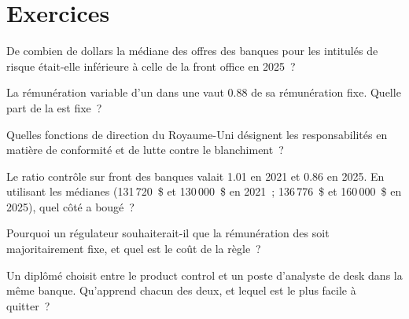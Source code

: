 \section{Exercices}

\begin{exercise}[$\star$]\label{exo:in:risk-operations-product-control-and-compliance:1}
De combien de dollars la médiane des offres des banques pour les intitulés de risque était-elle inférieure à celle de la front office en 2025~?
\end{exercise}

\begin{exercise}[$\star$]\label{exo:in:risk-operations-product-control-and-compliance:2}
La rémunération variable d'un  dans une  vaut 0.88 de sa rémunération fixe. Quelle part de la  est fixe~?
\end{exercise}

\begin{exercise}[$\star$]\label{exo:in:risk-operations-product-control-and-compliance:3}
Quelles fonctions de direction du Royaume-Uni désignent les responsabilités en matière de conformité et de lutte contre le blanchiment~?
\end{exercise}

\begin{exercise}[$\star\star$]\label{exo:in:risk-operations-product-control-and-compliance:4}
Le ratio contrôle sur front des banques valait 1.01 en 2021 et 0.86 en 2025. En utilisant les médianes (131\,720~\$ et
130\,000~\$ en 2021~; 136\,776~\$ et 160\,000~\$ en 2025), quel côté a bougé~?
\end{exercise}

\begin{exercise}[$\star\star$]\label{exo:in:risk-operations-product-control-and-compliance:5}
Pourquoi un régulateur souhaiterait-il que la rémunération des  soit majoritairement fixe, et quel est le coût de la règle~?
\end{exercise}

\begin{exercise}[$\star\star$]\label{exo:in:risk-operations-product-control-and-compliance:6}
Un diplômé choisit entre le product control et un poste d'analyste de desk dans la même banque. Qu'apprend chacun des deux, et lequel est le plus
facile à quitter~?
\end{exercise}

